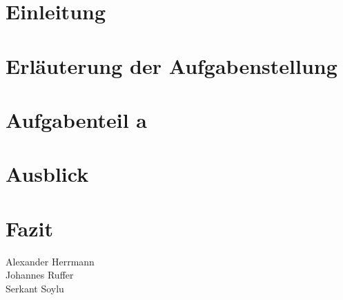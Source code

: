 \documentclass[12pt,			%
a4paper,						%
twoside, 						%
listof=totoc, 					%
bibliography=totoc,				%
titlepage, 						%
headsepline, 					%
DIV18,							%
BCOR6mm,						%
cleardoublepage=empty,			%
parskip,						%
ngerman							%
]{scrbook}
\begin{document}
\setcounter{secnumdepth}{3}				%
\setcounter{tocdepth}{3}
\sffamily								%





\tableofcontents						%
\cleardoublepage


\rmfamily

\chapter{Einleitung}
\setcounter{chapter}{1}


\chapter{Erläuterung der Aufgabenstellung}
\setcounter{chapter}{2}


\chapter{Aufgabenteil a}


\chapter{Ausblick}


\chapter {Fazit}


\renewcommand\thesection{\arabic{section}}
Alexander Herrmann\\
Johannes Ruffer\\
Serkant Soylu\\
\end{document}
